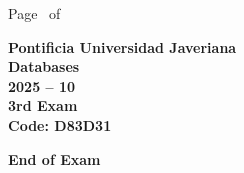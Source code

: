 \documentclass[11pt, addpoints]{exam}\usepackage[utf8]{inputenc}
\begin{document}
\begin{coverpages}
\begin{center}
			\vspace{3mm}
			\leavevmode \hspace{5mm} 
		\end{center}
	\end{coverpages}

	\footer{} {Page \thepage\ of \numpages} {}

	\centering
	\textbf{\Large Pontificia Universidad Javeriana}\\
	\textbf{\Large Databases} \\
	\textbf{\large 2025 -- 10} \\
	\textbf{\large 3rd Exam} \\
	\textbf{Code: D83D31}


	\begin{questions}
		
		
		
		
		
		
		
		
		
		
		
		
		
		
		
		
		
		
		
		
	\end{questions}

	\vspace{5mm}
	\noindent \textbf{End of Exam}
\end{document}

